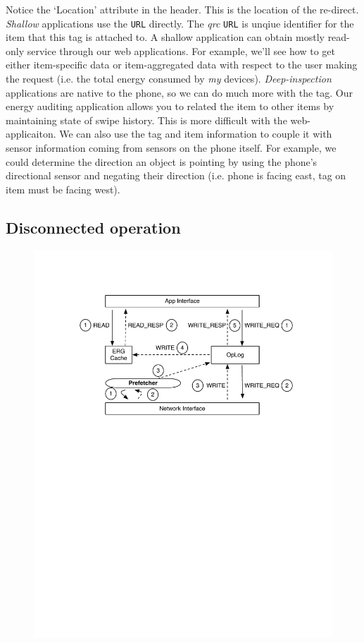 Notice the `Location' attribute in the header.  This is the location of the re-direct.  \emph{Shallow} applications
use the {\tt URL} directly.  The \emph{qrc} {\tt URL} is unqiue identifier for the item that this tag is attached to.
A shallow application can obtain mostly read-only service through our web applications.  For example, we'll see how
to get either item-specific data or item-aggregated data with respect to the user making the request (i.e. the total
energy consumed by \emph{my} devices).  \emph{Deep-inspection} applications are native to the phone, so we can do much
more with the tag.  Our energy auditing application allows you to related the item to other items by maintaining state of swipe
history.  This is more difficult with the web-applicaiton.  We can also use the tag and item information to couple it with
sensor information coming from sensors on the phone itself.  For example, we could determine the direction an object
is pointing by using the phone's directional sensor and negating their direction (i.e. phone is facing east, tag on item must
be facing west).

\subsection{Disconnected operation}


\begin{figure}[htb!]
\begin{center}
\includegraphics[scale=0.50]{figs/standard_interaction}
\caption{}
\label{fig:interactions}
\end{center}
\end{figure}


